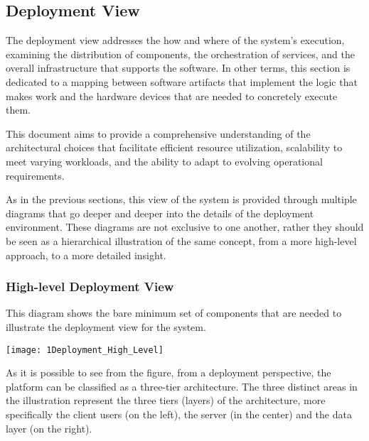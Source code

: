 \subsection{Deployment View}
The deployment view addresses the how and where of the \app system's execution, examining the distribution of components, the orchestration of services, and the overall infrastructure that supports the software. In other terms, this section is dedicated to a mapping between software artifacts that implement the logic that makes \app work and the hardware devices that are needed to concretely execute them.

This document aims to provide a comprehensive understanding of the architectural choices that facilitate efficient resource utilization, scalability to meet varying workloads, and the ability to adapt to evolving operational requirements. 

As in the previous sections, this view of the system is provided through multiple diagrams that go deeper and deeper into the details of the deployment environment. These diagrams are not exclusive to one another, rather they should be seen as a hierarchical illustration of the same concept, from a more high-level approach, to a more detailed insight.



\subsubsection{High-level Deployment View}
\begin{minipage}{\linewidth}
This diagram shows the bare minimum set of components that are needed to illustrate the deployment view for the \app system.

\vspace{1cm}
\begin{center}
\texttt{[image: 1Deployment\_High\_Level]}
\end{center}
\vspace{1.5cm}

\end{minipage}

As it is possible to see from the figure, from a deployment perspective, the \app platform can be classified as a three-tier architecture. The three distinct areas in the illustration represent the three tiers (layers) of the architecture, more specifically the client users (on the left), the server (in the center) and the data layer (on the right).

